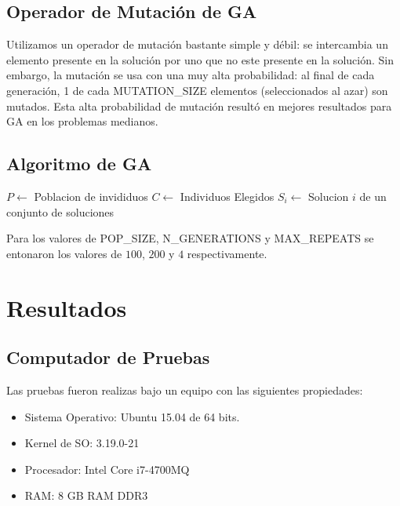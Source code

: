 \documentclass{ci5652}
\begin{document}
\subsection{Operador de Mutación de GA}
Utilizamos un operador de mutación bastante simple y débil: se intercambia un elemento presente en la solución por uno que no este presente en la solución. Sin embargo, la mutación se usa con una muy alta probabilidad: al final de cada generación, 1 de cada MUTATION\_SIZE elementos (seleccionados al azar) son mutados. Esta alta probabilidad de mutación resultó en mejores resultados para GA en los problemas medianos.

\subsection{Algoritmo de GA}
\begin{algorithm}
\DontPrintSemicolon
$P \leftarrow$ Poblacion de invididuos\;
$C \leftarrow$ Individuos Elegidos\;
$S_i \leftarrow$ Solucion $i$ de un conjunto de soluciones\;
\end{algorithm}

Para los valores de POP\_SIZE, N\_GENERATIONS y MAX\_REPEATS se entonaron los valores de $100$, $200$ y $4$ respectivamente.

\section{Resultados}

\subsection{Computador de Pruebas}
Las pruebas fueron realizas bajo un equipo con las siguientes propiedades:
\begin{itemize} \itemsep0pt
	\item Sistema Operativo: Ubuntu 15.04 de 64 bits.
	\item Kernel de SO: 3.19.0-21
	\item Procesador: Intel Core i7-4700MQ
	\item RAM: 8 GB RAM DDR3
\end{itemize}
\end{document}
